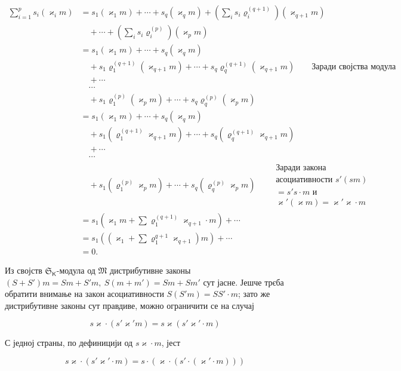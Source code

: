 \documentclass[11pt]{article}
\begin{document}
\[
\begin{aligned}
\sum_{i=1}^{p}s_i(\varkappa _i m)
&=s_1(\varkappa _1m)+\cdots+s_q(\varkappa _qm)
  +\left(\sum_i s_i\varrho_i^{(q+1)}\right)(\varkappa _{q+1}m)\\
&\quad+\cdots+\left(\sum_i s_i\varrho_i^{(p)}\right)(\varkappa _pm)\\
&=s_1(\varkappa _1m)+\cdots+s_q(\varkappa _qm)\\
&\quad+s_1\varrho_1^{(q+1)}(\varkappa _{q+1}m)+\cdots+s_q\varrho_q^{(q+1)}(\varkappa _{q+1}m)
  \qquad\text{Заради својства модула}\\
&\quad+\cdots\\
&\quad\cdots\\
&\quad+s_1\varrho_1^{(p)}(\varkappa _pm)+\cdots+s_q\varrho_q^{(p)}(\varkappa _pm)\\
&=s_1(\varkappa _1m)+\cdots+s_q(\varkappa _qm)\\
&\quad+s_1(\varrho_1^{(q+1)}\varkappa _{q+1}m)+\cdots+s_q(\varrho_q^{(q+1)}\varkappa _{q+1}m)\\
&\quad+\cdots\\
&\quad\cdots\\
&\quad+s_1(\varrho_1^{(p)}\varkappa _pm)+\cdots+s_q(\varrho_q^{(p)}\varkappa _pm)
  \qquad\begin{gathered}\text{Заради закона}\\ \text{асоциативности }s'(sm)\\ =s's\cdot m\text{ и}\\ \varkappa '(\varkappa m)=\varkappa '\varkappa \cdot m\end{gathered}\\
&=s_1\left(\varkappa _1m+\sum\varrho_1^{(q+1)}\varkappa _{q+1}\cdot m\right)+\cdots\\
&=s_1\left(\left(\varkappa _1+\sum\varrho_1^{q+1}\varkappa _{q+1}\right)m\right)+\cdots\\
&=0.
\end{aligned}
\]


Из својств \(\mathfrak S_{\mathsf K}\)-модула од \(\mathfrak M\) дистрибутивне законы \((S+S')m=Sm+S'm,\ S(m+m')=Sm+Sm'\) сут јасне. Јешче трєба обратити внимање на закон асоциативности \(S(S'm)=SS'\cdot m\); зато же дистрибутивне законы сут правдиве, можно ограничити се на случај

\[
s\varkappa \cdot(s'\varkappa ' m)=s\varkappa (s'\varkappa '\cdot m)
\]

С једној страны, по дефиницији од \(s\varkappa \cdot m\), јест

\[
s\varkappa \cdot(s'\varkappa '\cdot m)=s\cdot(\varkappa \cdot(s'\cdot(\varkappa '\cdot m)))
\]
\end{document}
